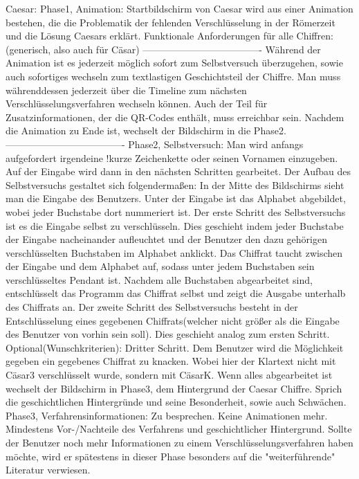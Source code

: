 \documentclass{article}
\begin{document}
Caesar:
Phase1, Animation:
Startbildschirm von Caesar wird aus einer Animation bestehen, die die Problematik der fehlenden Verschlüsselung in der Römerzeit und die Lösung Caesars erklärt. 
Funktionale Anforderungen für alle Chiffren:(generisch, also auch für Cäsar)
-------------------------------------
Während der Animation ist es jederzeit möglich sofort zum Selbstversuch überzugehen, sowie auch sofortiges wechseln zum textlastigen Geschichtsteil der Chiffre.
Man muss währenddessen jederzeit über die Timeline zum nächsten Verschlüsselungsverfahren wechseln können.
Auch der Teil für Zusatzinformationen, der die QR-Codes enthält, muss erreichbar sein. 
Nachdem die Animation zu Ende ist, wechselt der Bildschirm in die Phase2.
-------------------------------------
Phase2, Selbstversuch:
Man wird anfangs aufgefordert irgendeine !kurze Zeichenkette oder seinen Vornamen einzugeben. Auf der Eingabe wird dann in den nächsten Schritten gearbeitet.
             Der Aufbau des Selbstversuchs gestaltet sich folgendermaßen:
                    In der Mitte des Bildschirms sieht man die Eingabe des Benutzers. Unter der Eingabe ist das Alphabet abgebildet, wobei jeder Buchstabe dort nummeriert ist. Der erste Schritt des Selbstversuchs ist es die Eingabe selbst zu verschlüsseln. Dies geschieht indem jeder Buchstabe der Eingabe nacheinander aufleuchtet und der Benutzer den dazu gehörigen verschlüsselten Buchstaben im Alphabet anklickt. Das Chiffrat taucht zwischen der Eingabe und dem Alphabet auf, sodass unter jedem Buchstaben sein verschlüsseltes Pendant ist. Nachdem alle Buchstaben abgearbeitet sind, entschlüsselt das Programm das Chiffrat selbst und zeigt die Ausgabe unterhalb des Chiffrats an.
                     Der zweite Schritt des Selbstversuchs besteht in der Entschlüsselung eines gegebenen Chiffrats(welcher nicht größer als die Eingabe des Benutzer von vorhin sein soll). Dies geschieht analog zum ersten Schritt. 
Optional(Wunschkriterien): 
                    Dritter Schritt. Dem Benutzer wird die Möglichkeit gegeben ein gegebenes Chiffrat zu knacken. Wobei hier der Klartext nicht mit Cäsar3 verschlüsselt wurde, sondern mit CäsarK. 
 Wenn alles abgearbeitet ist wechselt der Bildschirm in Phase3, dem Hintergrund der Caesar Chiffre. Sprich die geschichtlichen Hintergründe und seine Besonderheit, sowie auch Schwächen.
Phase3, Verfahrensinformationen:
Zu besprechen. Keine Animationen mehr. Mindestens Vor-/Nachteile des Verfahrens und geschichtlicher Hintergrund.
Sollte der Benutzer noch mehr Informationen zu einem Verschlüsselungsverfahren haben möchte, wird er spätestens in dieser Phase besonders auf die "weiterführende" Literatur verwiesen.
\end{document}
